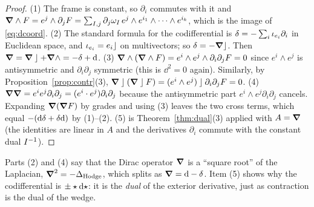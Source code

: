 \begin{proof}
(1) The frame is constant, so $\partial_i$ commutes with it and
$\boldsymbol{\nabla}\wedge F=e^j\wedge\partial_jF=\sum_{I,j}\partial_j\omega_I\,e^j\wedge e^{i_1}\wedge\cdots\wedge e^{i_k}$, which is the image of \eqref{eq:dcoord}.
(2) The standard formula for the codifferential is $\delta=-\sum_i\iota_{e_i}\partial_{i}$ in Euclidean space, and $\iota_{e_i}=e_i\mathbin{\rfloor}$ on multivectors; so $\delta=-\boldsymbol{\nabla}\mathbin{\rfloor}$. Then $\boldsymbol{\nabla}=\boldsymbol{\nabla}\mathbin{\rfloor}+\boldsymbol{\nabla}\wedge=-\delta+\mathrm{d}$.
(3) $\boldsymbol{\nabla}\wedge(\boldsymbol{\nabla}\wedge F)=e^i\wedge e^j\wedge\partial_i\partial_jF=0$ since $e^i\wedge e^j$ is antisymmetric and $\partial_i\partial_j$ symmetric (this is $\dd^2=0$ again). Similarly, by Proposition~\ref{prop:contr}(3), $\boldsymbol{\nabla}\mathbin{\rfloor}(\boldsymbol{\nabla}\mathbin{\rfloor} F)=(e^i\wedge e^j)\mathbin{\rfloor}\partial_i\partial_jF=0$.
(4) $\boldsymbol{\nabla}\boldsymbol{\nabla}=e^ie^j\partial_i\partial_j=(e^i\cdot e^j)\partial_i\partial_j$ because the antisymmetric part $e^i\wedge e^j\partial_i\partial_j$ cancels. Expanding $\boldsymbol{\nabla}(\boldsymbol{\nabla} F)$ by grades and using (3) leaves the two cross terms, which equal $-(\mathrm{d}\delta+\delta\mathrm{d})$ by (1)--(2).
(5) is Theorem~\ref{thm:dual}(3) applied with $A=\boldsymbol{\nabla}$ (the identities are linear in $A$ and the derivatives $\partial_i$ commute with the constant dual $I^{-1}$).
\end{proof}

\begin{remark}
Parts (2) and (4) say that the Dirac operator $\boldsymbol{\nabla}$ is a ``square root'' of the Laplacian, $\boldsymbol{\nabla}^2=-\Delta_{\mathrm{Hodge}}$, which splits as $\boldsymbol{\nabla}=\mathrm{d}-\delta$. Item (5) shows why the codifferential is $\pm\star\mathrm{d}\star$: it is the \emph{dual} of the exterior derivative, just as contraction is the dual of the wedge.
\end{remark}
